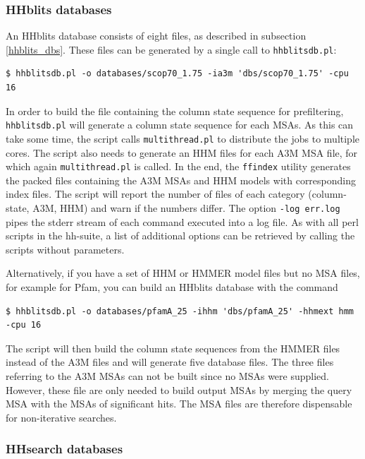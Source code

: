 \documentclass[11pt,a4paper]{article}
\begin{document}
\subsubsection*{HHblits databases}

An HHblits database consists of eight files, as described in subsection \ref{hhblits_dbs}. These files can be generated by a single call to \verb`hhblitsdb.pl`:
\begin{verbatim}
$ hhblitsdb.pl -o databases/scop70_1.75 -ia3m 'dbs/scop70_1.75' -cpu 16
\end{verbatim}
In order to build the file containing the column state sequence for prefiltering, \verb`hhblitsdb.pl` will generate a column state sequence for each MSAs. As this can take some time, the script calls \verb`multithread.pl` to distribute the jobs to multiple cores. The script also needs to generate an HHM files for each A3M MSA file, for which again \verb`multithread.pl` is called. In the end, the \verb`ffindex` utility generates the packed files containing the A3M MSAs and HHM models with corresponding index files. The script will report the number of files of each category (column-state, A3M, HHM) and warn if the numbers differ. The option \verb`-log err.log` pipes the stderr stream of each command executed into a log file. As with all perl scripts in the hh-suite, a list of additional options can be retrieved by calling the scripts without parameters.

Alternatively, if you have a set of HHM or HMMER model files but no MSA files, for example for Pfam, you can build an HHblits database with the command
\begin{verbatim}
$ hhblitsdb.pl -o databases/pfamA_25 -ihhm 'dbs/pfamA_25' -hhmext hmm -cpu 16
\end{verbatim}
The script will then build the column state sequences from the HMMER files instead of the A3M files and will generate five database files. The three files referring to the A3M MSAs can not be built since no MSAs were supplied. However, these file are only needed to build output MSAs by merging the query MSA with the MSAs of significant hits. The MSA files are therefore dispensable for non-iterative searches.


\subsubsection*{HHsearch databases}
\end{document}
